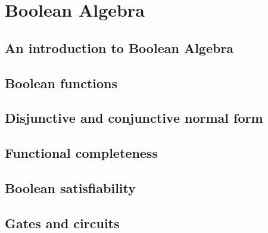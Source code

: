 \section{Boolean Algebra}
\subsection{An introduction to Boolean Algebra}
\subsection{Boolean functions}
\subsection{Disjunctive and conjunctive normal form}
\subsection{Functional completeness}
\subsection{Boolean satisfiability}
\subsection{Gates and circuits}